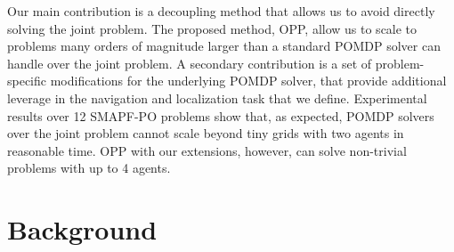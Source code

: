 \documentclass[letterpaper]{article}
\begin{document}
Our main contribution is a decoupling method that allows us to avoid directly solving the joint problem. The proposed method, OPP, allow us to scale to problems many orders of magnitude larger than a standard POMDP solver can handle over the joint problem. A secondary contribution is a set of problem-specific modifications for the underlying POMDP solver, that provide additional leverage in the navigation and localization task that we define.
Experimental results over 12 SMAPF-PO problems show that, as expected, POMDP solvers over the joint problem cannot scale beyond tiny grids with two agents in reasonable time. OPP with our extensions, however, can solve non-trivial problems with up to 4 agents.%

































\section{Background}
\end{document}
